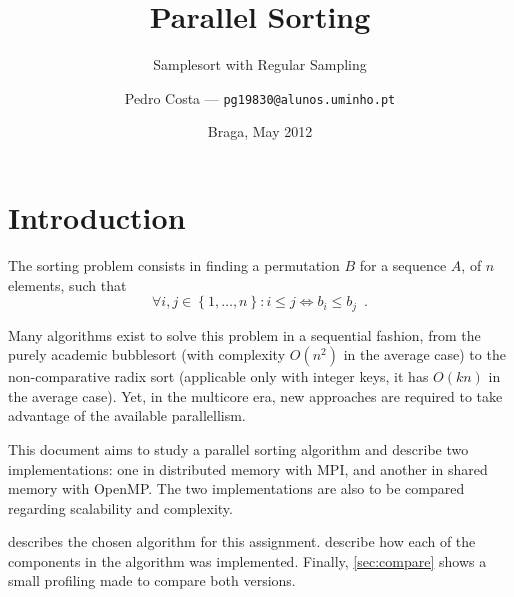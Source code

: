 \documentclass[abstract=on,9pt,twocolumn]{scrartcl}
\title{Parallel Sorting}
\subtitle{Samplesort with Regular Sampling}
\author{Pedro Costa \hfill--- \texttt{\smaller pg19830@alunos.uminho.pt}}
\date{Braga, May 2012}
\begin{document}
\maketitle

\section{Introduction}
The sorting problem consists in finding a permutation $B$ for a sequence $A$, of $n$ elements, such that
$$\forall i,j \in \left \{ 1 , \ldots , n \right \} : i \leq j \Leftrightarrow b_{i} \leq b_{j}\enspace .$$

Many algorithms exist to solve this problem in a sequential fashion, from the purely academic bubblesort (with complexity $O(n^{2})$ in the average case) to the non-comparative radix sort (applicable only with integer keys, it has $O(kn)$ in the average case). Yet, in the multicore era, new approaches are required to take advantage of the available parallellism. 

This document aims to study a parallel sorting algorithm and describe two implementations: one in distributed memory with MPI, and another in shared memory with OpenMP. The two implementations are also to be compared regarding scalability and complexity.

 describes the chosen algorithm for this assignment.  describe how each of the components in the algorithm was implemented. Finally, \cref{sec:compare} shows a small profiling made to compare both versions.
\end{document}

